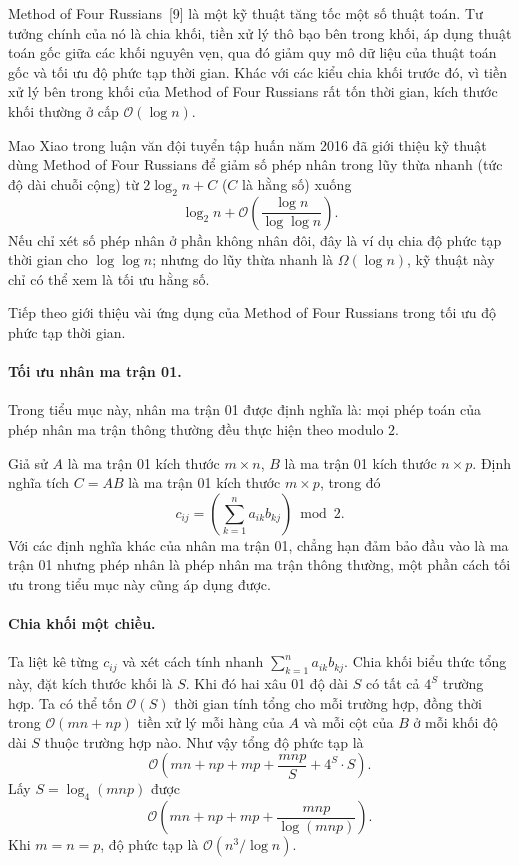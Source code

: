 \documentclass[11pt]{article}
\newcommand{\Oh}{\mathcal{O}}
\begin{document}
Method of Four Russians~[9] là một kỹ thuật tăng tốc một số thuật toán. Tư
tưởng chính của nó là chia khối, tiền xử lý thô bạo bên trong khối, áp dụng
thuật toán gốc giữa các khối nguyên vẹn, qua đó giảm quy mô dữ liệu của thuật
toán gốc và tối ưu độ phức tạp thời gian. Khác với các kiểu chia khối trước
đó, vì tiền xử lý bên trong khối của Method of Four Russians rất tốn thời
gian, kích thước khối thường ở cấp \(\Oh(\log n)\).

Mao Xiao trong luận văn đội tuyển tập huấn năm 2016 đã giới thiệu kỹ thuật
dùng Method of Four Russians để giảm số phép nhân trong lũy thừa nhanh (tức
độ dài chuỗi cộng) từ \(2\log_2 n+C\) (\(C\) là hằng số) xuống
\[
  \log_2 n+\Oh\left(\frac{\log n}{\log\log n}\right).
\]
Nếu chỉ xét số phép nhân ở phần không nhân đôi, đây là ví dụ chia độ phức tạp
thời gian cho \(\log\log n\); nhưng do lũy thừa nhanh là \(\Omega(\log n)\),
kỹ thuật này chỉ có thể xem là tối ưu hằng số.

Tiếp theo giới thiệu vài ứng dụng của Method of Four Russians trong tối ưu độ
phức tạp thời gian.

\paragraph{Tối ưu nhân ma trận 01.}
Trong tiểu mục này, nhân ma trận 01 được định nghĩa là: mọi phép toán của phép
nhân ma trận thông thường đều thực hiện theo modulo \(2\).

Giả sử \(A\) là ma trận 01 kích thước \(m\times n\), \(B\) là ma trận 01 kích
thước \(n\times p\). Định nghĩa tích \(C=AB\) là ma trận 01 kích thước
\(m\times p\), trong đó
\[
  c_{ij}=
  \left(\sum_{k=1}^{n}a_{ik}b_{kj}\right)\bmod 2.
\]
Với các định nghĩa khác của nhân ma trận 01, chẳng hạn đảm bảo đầu vào là ma
trận 01 nhưng phép nhân là phép nhân ma trận thông thường, một phần cách tối
ưu trong tiểu mục này cũng áp dụng được.

\paragraph{Chia khối một chiều.}
Ta liệt kê từng \(c_{ij}\) và xét cách tính nhanh
\(\sum_{k=1}^{n}a_{ik}b_{kj}\). Chia khối biểu thức tổng này, đặt kích thước
khối là \(S\). Khi đó hai xâu 01 độ dài \(S\) có tất cả \(4^S\) trường hợp.
Ta có thể tốn \(\Oh(S)\) thời gian tính tổng cho mỗi trường hợp, đồng thời
trong \(\Oh(mn+np)\) tiền xử lý mỗi hàng của \(A\) và mỗi cột của \(B\) ở mỗi
khối độ dài \(S\) thuộc trường hợp nào. Như vậy tổng độ phức tạp là
\[
  \Oh\left(mn+np+mp+\frac{mnp}{S}+4^S\cdot S\right).
\]
Lấy \(S=\log_4(mnp)\) được
\[
  \Oh\left(mn+np+mp+\frac{mnp}{\log(mnp)}\right).
\]
Khi \(m=n=p\), độ phức tạp là \(\Oh(n^3/\log n)\).
\end{document}
